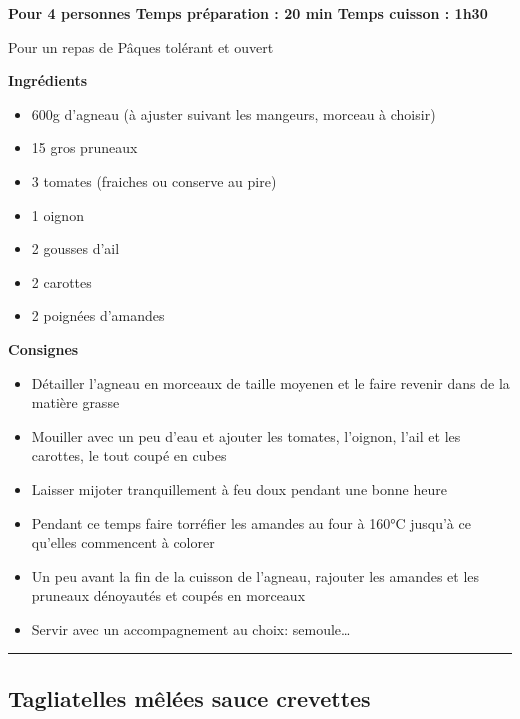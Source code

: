 \documentclass[]{book}
\providecommand{\tightlist}{%
  \setlength{\itemsep}{0pt}\setlength{\parskip}{0pt}}
\begin{document}
\begin{salebox}
\textbf{Pour 4 personnes \textbar{} Temps préparation : 20 min
\textbar{} Temps cuisson : 1h30}

Pour un repas de Pâques tolérant et ouvert
\end{salebox}

\textbf{Ingrédients}

\begin{itemize}
\tightlist
\item
  600g d'agneau (à ajuster suivant les mangeurs, morceau à choisir)
\item
  15 gros pruneaux
\item
  3 tomates (fraiches ou conserve au pire)
\item
  1 oignon
\item
  2 gousses d'ail
\item
  2 carottes
\item
  2 poignées d'amandes
\end{itemize}

\textbf{Consignes}

\begin{itemize}
\tightlist
\item
  Détailler l'agneau en morceaux de taille moyenen et le faire revenir dans de la matière grasse
\item
  Mouiller avec un peu d'eau et ajouter les tomates, l'oignon, l'ail et les carottes, le tout coupé en cubes
\item
  Laisser mijoter tranquillement à feu doux pendant une bonne heure
\item
  Pendant ce temps faire torréfier les amandes au four à 160°C jusqu'à ce qu'elles commencent à colorer
\item
  Un peu avant la fin de la cuisson de l'agneau, rajouter les amandes et les pruneaux dénoyautés et coupés en morceaux
\item
  Servir avec un accompagnement au choix: semoule\ldots{}
\end{itemize}

\begin{center}\rule{0.5\linewidth}{0.5pt}\end{center}

\hypertarget{tagliatelles-muxealuxe9es-sauce-crevettes}{%
\subsection*{\texorpdfstring{{Tagliatelles mêlées sauce crevettes}}{Tagliatelles mêlées sauce crevettes}}\label{tagliatelles-muxealuxe9es-sauce-crevettes}}
\end{document}
